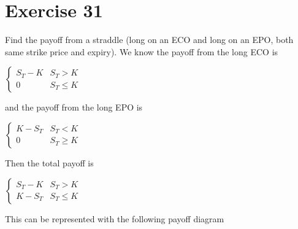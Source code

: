 \documentclass{article}
\begin{document}
\section*{Exercise 31}
\begin{flushleft}
Find the payoff from a straddle (long on an ECO and long on an EPO, both same strike price and expiry).
We know the payoff from the long ECO is 
\begin{center}
    $\begin{cases}
        S_T - K & S_T > K \\
        0 & S_T \leq K
    \end{cases}$
\end{center}
and the payoff from the long EPO is
\begin{center}
    $\begin{cases}
        K-S_T & S_T < K \\
        0 & S_T \geq K
    \end{cases}$
\end{center}
Then the total payoff is
\begin{center}
    $\begin{cases}
        S_T - K & S_T > K \\
        K - S_T & S_T \leq K
    \end{cases}$
\end{center}
This can be represented with the following payoff diagram
\begin{center}
\end{center}
\end{flushleft}
\end{document}
